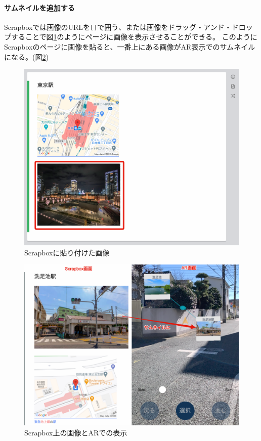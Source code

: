 \paragraph*{サムネイルを追加する}
Scrapboxでは画像のURLを\texttt{[]}で囲う、または画像をドラッグ・アンド・ドロップすることで図\ref{fig:scrapbox_thumbnail}のようにページに画像を表示させることができる。
このようにScrapboxのページに画像を貼ると、一番上にある画像がAR表示でのサムネイルになる。(図\ref{fig:scrapbox_thumbnail_and_ar})

\begin{figure}[h]
  \centering
  \includegraphics[width=120mm]{images/scrapbox_thumbnail.png}
  \caption{Scrapboxに貼り付けた画像} \label{fig:scrapbox_thumbnail}
\end{figure}

\begin{figure}[h]
  \centering
  \includegraphics[width=120mm]{images/scrapbox_thumbnail_and_ar.png}
  \caption{Scrapbox上の画像とARでの表示} \label{fig:scrapbox_thumbnail_and_ar}
\end{figure}

